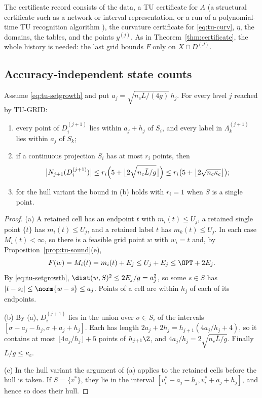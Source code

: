 The certificate record consists of the data, a TU certificate for $A$
(a structural certificate such as a network or interval representation, or a
run of a polynomial-time TU recognition algorithm \cite[Chapter~20]{Schrijver1986}),
the curvature certificate for \eqref{eq:tu-curv}, $\eta$, the domains, the
tables, and the points $y^{(j)}$. As in Theorem~\ref{thm:certificate}, the
whole history is needed: the last grid bounds $F$ only on $X\cap D^{(J)}$.

\subsection{Accuracy-independent state counts}\label{sec:tu-states}

\begin{theorem}\label{thm:tu-states}
Assume \eqref{eq:tu-setgrowth} and put $a_j=\sqrt{n_c\bar L/(4g)}\,h_j$. For
every level $j$ reached by TU-GRID:
\begin{enumerate}[label=(\alph*)]
\item every point of $D^{(j+1)}_i$ lies within $a_j+h_j$ of $S_i$, and every
label in $\Lambda^{(j+1)}_k$ lies within $a_j$ of $S_k$;
\item if a continuous projection $S_i$ has at most $r_i$ points, then
\[
\bigl\lvert N_{j+1}(D^{(j+1)}_i)\bigr\rvert\le
r_i\Bigl(5+\bigl\lfloor2\sqrt{n_c\bar L/g}\bigr\rfloor\Bigr)
\le r_i\bigl(5+\bigl\lfloor2\sqrt{n_c\kappa_c}\bigr\rfloor\bigr);
\]
\item for the hull variant the bound in (b) holds with $r_i=1$ when $S$ is a
single point.
\end{enumerate}
\end{theorem}

\begin{proof}
(a) A retained cell has an endpoint $t$ with $m_i(t)\le U_j$, a retained
single point $\{t\}$ has $m_i(t)\le U_j$, and a retained label $t$ has
$m_k(t)\le U_j$. In each case $M_i(t)<\infty$, so there is a feasible grid
point $w$ with $w_i=t$ and, by Proposition~\ref{prop:tu-sound}(e),
\[
F(w)=M_i(t)=m_i(t)+E_j\le U_j+E_j\le\OPT+2E_j .
\]
By \eqref{eq:tu-setgrowth}, $\dist(w,S)^2\le2E_j/g=a_j^2$, so some $s\in S$
has $\lvert t-s_i\rvert\le\norm{w-s}\le a_j$. Points of a cell are within $h_j$
of each of its endpoints.

(b) By (a), $D^{(j+1)}_i$ lies in the union over $\sigma\in S_i$ of the
intervals $[\sigma-a_j-h_j,\sigma+a_j+h_j]$. Each has length
$2a_j+2h_j=h_{j+1}(4a_j/h_j+4)$, so it contains at most
$\lfloor4a_j/h_j\rfloor+5$ points of $h_{j+1}\Z$, and
$4a_j/h_j=2\sqrt{n_c\bar L/g}$. Finally $\bar L/g\le\kappa_c$.

(c) In the hull variant the argument of (a) applies to the retained cells
before the hull is taken. If $S=\{v^*\}$, they lie in the interval
$[v^*_i-a_j-h_j,v^*_i+a_j+h_j]$, and hence so does their hull.
\end{proof}


